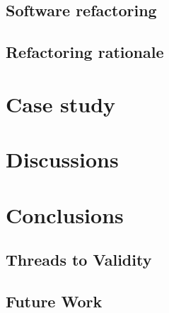 \documentclass[english,12pt,a4paper,pdftex,sci,utf8]{aaltothesis}
\begin{document}
\subsection{Software refactoring}
\subsection{Refactoring rationale}


\section{Case study} \label{case study}


\section{Discussions} \label{discussions}
\section{Conclusions} \label{conclusions}
\subsection{Threads to Validity} \label{validity}
\subsection{Future Work} \label{future}

\clearpage

{}
\begin{thebibliography}{99}



  


\end{thebibliography}
\end{document}

